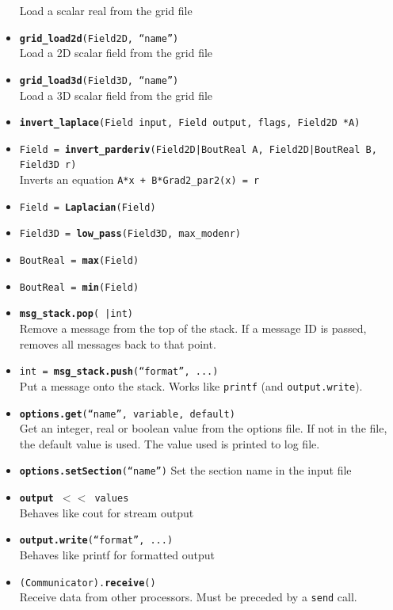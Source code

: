 \documentclass[12pt]{article}
\newcommand{\code}[1]{\texttt{#1}}
\begin{document}
\begin{itemize}
    Load a scalar real from the grid file
  \item \texttt{{\bf grid\_load2d}(Field2D, ``name'')} \\
    Load a 2D scalar field from the grid file
  \item \texttt{{\bf grid\_load3d}(Field3D, ``name'')} \\
    Load a 3D scalar field from the grid file
  \item \texttt{{\bf invert\_laplace}(Field input, Field output, flags, Field2D *A)}
  \item \texttt{Field = {\bf invert\_parderiv}(Field2D|BoutReal A, Field2D|BoutReal B, Field3D r)} \\
    Inverts an equation  \code{A*x + B*Grad2\_par2(x) = r}
  \item \texttt{Field = {\bf Laplacian}(Field)}
  \item \texttt{Field3D = {\bf low\_pass}(Field3D, max\_modenr)}
  \item \texttt{BoutReal = {\bf max}(Field)}
  \item \texttt{BoutReal = {\bf min}(Field)}
  \item \texttt{{\bf msg\_stack.pop}( |int)} \\
    Remove a message from the top of the stack. If a message ID is passed,
    removes all messages back to that point.
  \item \texttt{int = {\bf msg\_stack.push}(``format'', ...)} \\
    Put a message onto the stack. Works like \code{printf} (and \code{output.write}).
  \item \texttt{{\bf options.get}(``name'', variable, default)} \\
    Get an integer, real or boolean value from the options file.
    If not in the file, the default value is used. The value
    used is printed to log file.
  \item \texttt{{\bf options.setSection}(``name'')}
    Set the section name in the input file
  \item \texttt{{\bf output} $< <$ values} \\
    Behaves like cout for stream output
  \item \texttt{{\bf output.write}(``format'', ...)}  \\
    Behaves like printf for formatted output
  \item \texttt{(Communicator).{\bf{receive}}()} \\
    Receive data from other processors. Must be preceded by a \code{send} call.

\end{itemize}
\end{document}
